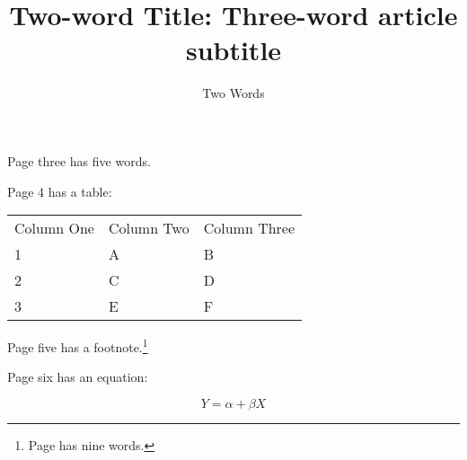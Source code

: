 \documentclass{article}
\begin{document}
\title{Two-word Title: Three-word article subtitle}
\author{Two Words}
\date{}

\maketitle

\clearpage


\clearpage

Page three has five words.

\clearpage

Page 4 has a table:

\begin{tabular}{lll}
Column One & Column Two & Column Three \\
1 & A & B \\
2 & C & D \\
3 & E & F \\
\end{tabular}

\clearpage

Page five has a footnote.\footnote{Page has nine words.}

\clearpage

Page six has an equation:

\begin{equation}
Y = \alpha + \beta X
\end{equation}
\end{document}
